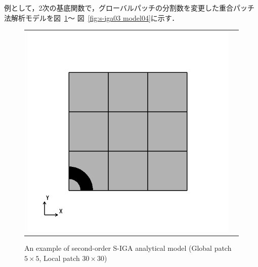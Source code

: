 例として，2次の基底関数で，グローバルパッチの分割数を変更した重合パッチ法解析モデルを図~\ref{fig:s-iga03 model01}～
図~\ref{fig:s-iga03 model04}に示す．

\begin{figure}[htbp]
  \begin{tabular}{cc}
    \begin{minipage}[t]{0.45\hsize}
      \centering
      \includegraphics[keepaspectratio, scale=0.3]
      {fig/result_data_etc/s-iga03/model/5x5.png}
      \caption{An example of second-order S-IGA analytical model (Global patch $5\times 5$, Local patch $30\times 30$)}
      \label{fig:s-iga03 model01}
    \end{minipage} &
    \begin{minipage}[t]{0.45\hsize}
      \centering
      \includegraphics[keepaspectratio, scale=0.3]

\end{minipage}
\end{tabular}
\end{figure}
